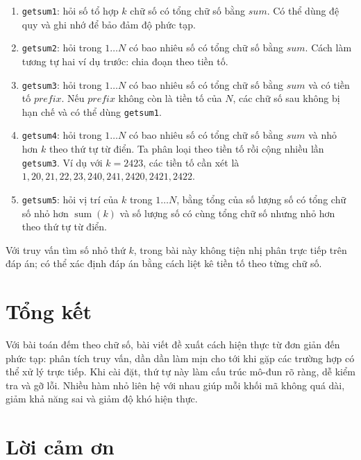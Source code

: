 \documentclass[11pt]{article}
\begin{document}
\begin{enumerate}
  \item \texttt{getsum1}: hỏi số tổ hợp \(k\) chữ số có tổng chữ số bằng
  \(\mathit{sum}\). Có thể dùng đệ quy và ghi nhớ để bảo đảm độ phức tạp.

  \item \texttt{getsum2}: hỏi trong \(1\ldots N\) có bao nhiêu số có tổng chữ
  số bằng \(\mathit{sum}\). Cách làm tương tự hai ví dụ trước: chia đoạn theo
  tiền tố.

  \item \texttt{getsum3}: hỏi trong \(1\ldots N\) có bao nhiêu số có tổng chữ
  số bằng \(\mathit{sum}\) và có tiền tố \(\mathit{prefix}\). Nếu
  \(\mathit{prefix}\) không còn là tiền tố của \(N\), các chữ số sau không bị
  hạn chế và có thể dùng \texttt{getsum1}.

  \item \texttt{getsum4}: hỏi trong \(1\ldots N\) có bao nhiêu số có tổng chữ
  số bằng \(\mathit{sum}\) và nhỏ hơn \(k\) theo thứ tự từ điển. Ta phân loại
  theo tiền tố rồi cộng nhiều lần \texttt{getsum3}. Ví dụ với \(k=2423\), các
  tiền tố cần xét là \(1,20,21,22,23,240,241,2420,2421,2422\).

  \item \texttt{getsum5}: hỏi vị trí của \(k\) trong \(1\ldots N\), bằng tổng
  của số lượng số có tổng chữ số nhỏ hơn \(\operatorname{sum}(k)\) và số lượng
  số có cùng tổng chữ số nhưng nhỏ hơn theo thứ tự từ điển.
\end{enumerate}

Với truy vấn tìm số nhỏ thứ \(k\), trong bài này không tiện nhị phân trực tiếp
trên đáp án; có thể xác định đáp án bằng cách liệt kê tiền tố theo từng chữ số.

\section{Tổng kết}

Với bài toán đếm theo chữ số, bài viết đề xuất cách hiện thực từ đơn giản đến
phức tạp: phân tích truy vấn, dần dần làm mịn cho tới khi gặp các trường hợp
có thể xử lý trực tiếp. Khi cài đặt, thứ tự này làm cấu trúc mô-đun rõ ràng,
dễ kiểm tra và gỡ lỗi. Nhiều hàm nhỏ liên hệ với nhau giúp mỗi khối mã không
quá dài, giảm khả năng sai và giảm độ khó hiện thực.

\section*{Lời cảm ơn}
\end{document}
